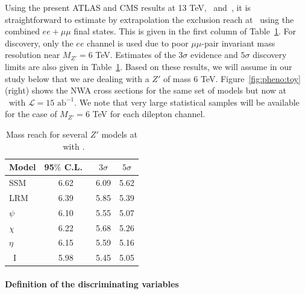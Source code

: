 \documentclass[a4paper,11pt]{article}
\newcommand*{\intlumihelhc}{\ensuremath{\mathcal{L}=15\text{ ab}^{-1}}}
\newcommand*{\cl}{C.L.~}
\begin{document}
Using the present ATLAS and CMS results at 13 TeV,~\cite{Aaboud:2017buh} and~\cite{Sirunyan:2018exx}, it is straightforward to estimate by extrapolation the
exclusion reach at \sqrtslhc\ using the combined $ee+\mu\mu$ final states. This is given in the first column of Table~\ref{tab:pheno:spec}. For discovery, only the $ee$ channel is used due to poor $\mu\mu$-pair invariant mass resolution near $M_{Z'}=6$ TeV. Estimates of the $3\sigma$ evidence and $5\sigma$
discovery limits are also given in Table~\ref{tab:pheno:spec}. Based on these results, we will assume in our study below that we are dealing with a $Z'$ of mass 6 TeV. Figure~\ref{fig:pheno:toy} (right) shows the NWA cross sections for the same set of models but now at \sqrtshelhc\ with \intlumihelhc. We note that very large statistical samples will be available for the case of $M_{Z'}=6$ TeV
for each dilepton channel.

%
\begin{table}
\centering
\begin{tabular}{|l|c|c|c|} \hline\hline
  Model &   95$\%$ \cl  &  $3\sigma$  & $5\sigma$   \\
\hline
SSM    &     6.62     &  6.09    &  5.62     \\
LRM    &   6.39     & 5.85     & 5.39  \\
$\psi$    &  6.10   & 5.55   & 5.07  \\
$\chi$   &  6.22    & 5.68    & 5.26   \\
$\eta$   &  6.15     &  5.59  &  5.16   \\
~I        & 5.98   &  5.45   &  5.05  \\
\hline\hline
\end{tabular}
\caption{ Mass reach for several $Z'$ models at \sqrtslhc\ with \intlumihllhc. }
\label{tab:pheno:spec}
\end{table}
%
\paragraph*{Definition of the discriminating variables}
\label{par:vardef}
\end{document}
